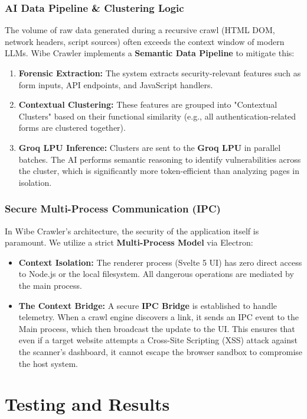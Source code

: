 \documentclass[12pt,oneside,a4paper]{book}
\begin{document}
\subsection{AI Data Pipeline \& Clustering Logic}
The volume of raw data generated during a recursive crawl (HTML DOM, network headers, script sources) often exceeds the context window of modern LLMs. Wibe Crawler implements a \textbf{Semantic Data Pipeline} to mitigate this:
\begin{enumerate}
    \item \textbf{Forensic Extraction:} The system extracts security-relevant features such as form inputs, API endpoints, and JavaScript handlers.
    \item \textbf{Contextual Clustering:} These features are grouped into "Contextual Clusters" based on their functional similarity (e.g., all authentication-related forms are clustered together). 
    \item \textbf{Groq LPU Inference:} Clusters are sent to the \textbf{Groq LPU} in parallel batches. The AI performs semantic reasoning to identify vulnerabilities across the cluster, which is significantly more token-efficient than analyzing pages in isolation.
\end{enumerate}

\subsection{Secure Multi-Process Communication (IPC)}
In Wibe Crawler's architecture, the security of the application itself is paramount. We utilize a strict \textbf{Multi-Process Model} via Electron:
\begin{itemize}
    \item \textbf{Context Isolation:} The renderer process (Svelte 5 UI) has zero direct access to Node.js or the local filesystem. All dangerous operations are mediated by the main process.
    \item \textbf{The Context Bridge:} A secure \textbf{IPC Bridge} is established to handle telemetry. When a crawl engine discovers a link, it sends an IPC event to the Main process, which then broadcast the update to the UI. This ensures that even if a target website attempts a Cross-Site Scripting (XSS) attack against the scanner's dashboard, it cannot escape the browser sandbox to compromise the host system.
\end{itemize}

\chapter{Testing and Results}
\label{chap:testing}
\end{document}
